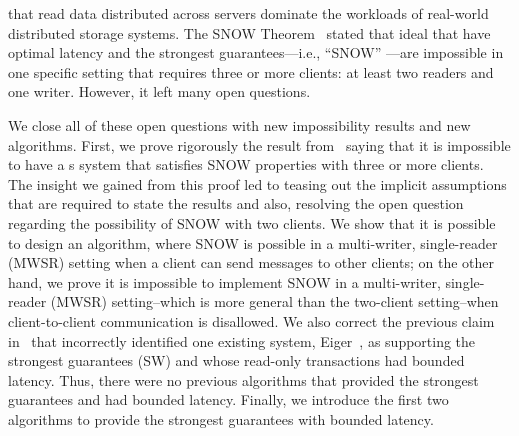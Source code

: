 \rots{} that read data distributed across servers dominate the workloads of real-world distributed storage systems.
The SNOW Theorem~\cite{SNOW2016} stated that ideal \rots{} that have optimal latency and the strongest guarantees---i.e., ``SNOW'' \rots{}---are impossible in one specific setting that requires three or more clients: at least two readers and one writer. However, it left many open questions.

We close all of these open questions with new impossibility results and new algorithms.
First, we prove rigorously the result from~\cite{SNOW2016} saying that it is impossible to have a \rot{}s system that satisfies SNOW properties with three or more clients.
The insight we gained from this proof led to teasing out the implicit assumptions that are required to state the results and also, resolving the open question regarding the possibility of SNOW with two clients.
We show that it is possible to design an algorithm, where SNOW is possible in a multi-writer, single-reader (MWSR) setting when a client can send messages to other clients;
on the other hand, we prove it is impossible to implement SNOW in a multi-writer, single-reader (MWSR) setting--which is more general than the two-client setting--when client-to-client communication is disallowed.
We also correct the previous claim in~\cite{SNOW2016} that incorrectly identified one existing system, Eiger~\cite{Lloyd:nsdi2013}, as supporting the strongest guarantees (SW) and whose read-only transactions had bounded latency. Thus, there were no previous algorithms that provided the strongest guarantees and had bounded latency. Finally, we introduce the first two algorithms to provide the strongest guarantees with bounded latency.






